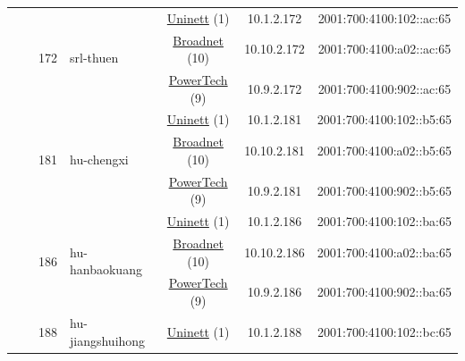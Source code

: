 \begin{small}
\begin{center}
\begin{longtable}{|c|c|c|c|c|c|c|c|}
  &  & \multirow{3}{*}{\tiny{172}} & \multicolumn{1}{|l|}{\multirow{3}{*}{\tiny{srl-thuen}}} & \multicolumn{2}{|c|}{\tiny{\href{https://www.uninett.no}{Uninett} (1)}} & \tiny{10.1.2.172} & \tiny{2001:700:4100:102::ac:65} \\* \cline{5-5}\cline{6-6}\cline{7-7}\cline{8-8}
  &  &  &  & \multicolumn{2}{|c|}{\tiny{\href{https://www.broadnet.no}{Broadnet} (10)}} & \tiny{10.10.2.172} & \tiny{2001:700:4100:a02::ac:65} \\* \cline{5-5}\cline{6-6}\cline{7-7}\cline{8-8}
  &  &  &  & \multicolumn{2}{|c|}{\tiny{\href{http://www.powertech.no}{PowerTech} (9)}} & \tiny{10.9.2.172} & \tiny{2001:700:4100:902::ac:65} \\* \cline{3-3}\cline{4-4}\cline{5-5}\cline{6-6}\cline{7-7}\cline{8-8}
  &  & \multirow{3}{*}{\tiny{181}} & \multicolumn{1}{|l|}{\multirow{3}{*}{\tiny{hu-chengxi}}} & \multicolumn{2}{|c|}{\tiny{\href{https://www.uninett.no}{Uninett} (1)}} & \tiny{10.1.2.181} & \tiny{2001:700:4100:102::b5:65} \\* \cline{5-5}\cline{6-6}\cline{7-7}\cline{8-8}
  &  &  &  & \multicolumn{2}{|c|}{\tiny{\href{https://www.broadnet.no}{Broadnet} (10)}} & \tiny{10.10.2.181} & \tiny{2001:700:4100:a02::b5:65} \\* \cline{5-5}\cline{6-6}\cline{7-7}\cline{8-8}
  &  &  &  & \multicolumn{2}{|c|}{\tiny{\href{http://www.powertech.no}{PowerTech} (9)}} & \tiny{10.9.2.181} & \tiny{2001:700:4100:902::b5:65} \\* \cline{3-3}\cline{4-4}\cline{5-5}\cline{6-6}\cline{7-7}\cline{8-8}
  &  & \multirow{3}{*}{\tiny{186}} & \multicolumn{1}{|l|}{\multirow{3}{*}{\tiny{hu-hanbaokuang}}} & \multicolumn{2}{|c|}{\tiny{\href{https://www.uninett.no}{Uninett} (1)}} & \tiny{10.1.2.186} & \tiny{2001:700:4100:102::ba:65} \\* \cline{5-5}\cline{6-6}\cline{7-7}\cline{8-8}
  &  &  &  & \multicolumn{2}{|c|}{\tiny{\href{https://www.broadnet.no}{Broadnet} (10)}} & \tiny{10.10.2.186} & \tiny{2001:700:4100:a02::ba:65} \\* \cline{5-5}\cline{6-6}\cline{7-7}\cline{8-8}
  &  &  &  & \multicolumn{2}{|c|}{\tiny{\href{http://www.powertech.no}{PowerTech} (9)}} & \tiny{10.9.2.186} & \tiny{2001:700:4100:902::ba:65} \\* \cline{3-3}\cline{4-4}\cline{5-5}\cline{6-6}\cline{7-7}\cline{8-8}
  &  & \multirow{3}{*}{\tiny{188}} & \multicolumn{1}{|l|}{\multirow{3}{*}{\tiny{hu-jiangshuihong}}} & \multicolumn{2}{|c|}{\tiny{\href{https://www.uninett.no}{Uninett} (1)}} & \tiny{10.1.2.188} & \tiny{2001:700:4100:102::bc:65} \\* \cline{5-5}\cline{6-6}\cline{7-7}\cline{8-8}

\end{longtable}
\end{center}
\end{small}
